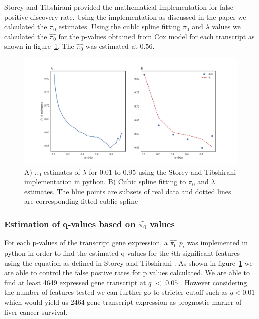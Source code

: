 \documentclass{article}
\begin{document}
	Storey and Tibshirani \cite{storey2003statistical} provided the mathematical implementation for false positive discovery rate.  Using the implementation as discussed in the paper we calculated the $\pi_0$ estimates. Using the cublc spline fitting $\pi_0$ and  $\lambda$ values we calculated the  $\hat {\pi_0}$ for the p-values obtained from Cox model for each transcript as shown in figure~\ref{fig:estimate_pi}. The  $\hat {\pi_0}$  was estimated at $0.56$. 
\vspace{50cm} 
\begin{figure}
    \centering
     \includegraphics[width=\textwidth]{lambdaestimatescurvefitting.png}
    \caption{ A) $\pi_0$ estimates of $\lambda$  for $0.01$ to $0.95$ using the Storey and Tibshirani \cite{storey2003statistical} implementation in python. B) Cubic spline fitting to $\pi_0$  and $\lambda$ estimates. The blue points are subsets of real data and dotted lines are corresponding  fitted cublic spline   \tiny}
    \label{fig:estimate_pi}
\end{figure}

	\subsubsection {Estimation of q-values based on $\hat {\pi_0}$  values }
	 For each p-values of the transcript gene expression, a $\hat {\pi_0}$ $p_i$  was implemented in python in order to find the estimated q values for the  $i$th significant features using the equation as defined in Storey and Tibshirani \cite{storey2003statistical}. As shown in figure~\ref{fig:estimate_pi} we are able to control the false postive rates for p values calculated. We are able to find at least 4649 expressed gene transcript at $q$ $<$ $0.05$ . However considering the number of features tested we can further go to stricter cutoff such as $q < 0.01$ which would yield us 2464 gene transcript expression  as prognostic marker of liver cancer survival. 
\end{document}
